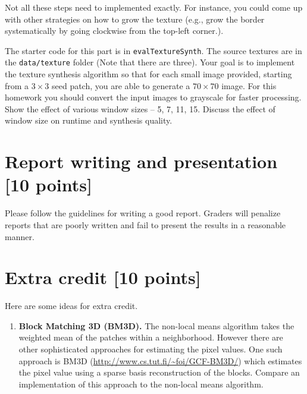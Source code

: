 \documentclass[10pt,letterpaper]{article}
\newcommand{\cmd}[1] {{\color{blue}\texttt{#1}}}
\begin{document}
\begin{itemize}
Not all these steps need to implemented exactly. For instance, you
could come up with other strategies on how to grow the texture (e.g., grow the border
systematically by going clockwise from the top-left corner.).

The starter code for this part is in \cmd{evalTextureSynth}. The
source textures are in the \cmd{data/texture} folder (Note that
there are three).
Your goal is to implement the texture synthesis algorithm so that for
each small image provided, starting from a $3 \times 3$ seed patch,
you are able to generate a $70 \times 70$ image. 
For this homework you should convert the input
images to grayscale for faster processing.
Show the effect of various window sizes -- 5, 7, 11, 15. 
Discuss the effect of window size on runtime and synthesis quality. 



\section{Report writing and presentation [10 points]}

Please follow the guidelines for writing a good report.
Graders will penalize reports that are poorly written and fail to present the results in a reasonable manner.



\section{Extra credit [10 points]}
Here are some ideas for extra credit. 

\begin{enumerate}

\item \textbf{Block Matching 3D (BM3D).} The non-local means algorithm
  takes the weighted mean of the patches within a
  neighborhood. However there are other sophisticated approaches for
  estimating the pixel values. One such approach is BM3D
  (\url{http://www.cs.tut.fi/~foi/GCF-BM3D/}) which estimates the
  pixel value using a sparse basis reconstruction of the
  blocks. Compare an implementation of this approach to the non-local
  means algorithm.


\end{enumerate}
\end{itemize}
\end{document}
